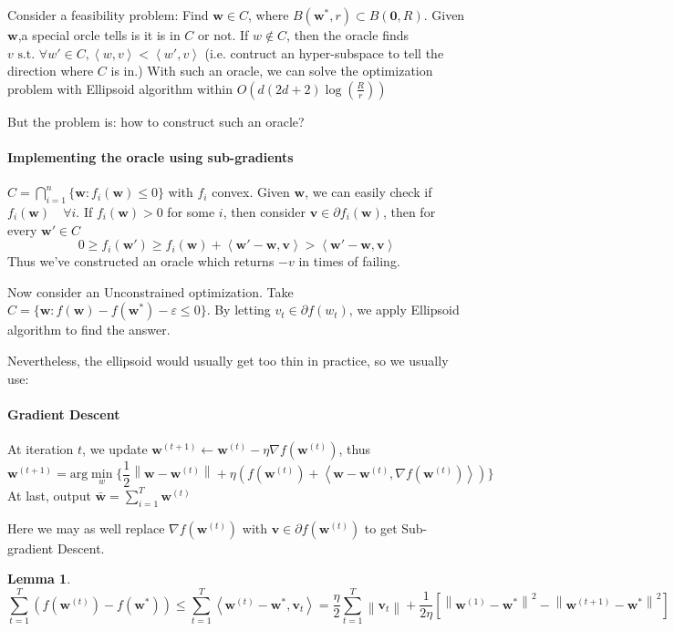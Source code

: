 \documentclass{book}
\newcommand{\st}{\text{ s.t. }}
\newcommand{\nm}[1]{\left\|#1\right\|}
\newcommand{\dual}[1]{\left<#1\right>}
\newtheorem{Lemma}[Thm]{Lemma}
\begin{document}
Consider a feasibility problem: Find $\mathbf{w} \in C$, where $B(\bm{w^{*}},r)\subset B(\mathbf{0},R)$. Given $\mathbf{w}$,a special orcle tells is it is in $C$ or not.  If $w\not \in C$, then the oracle finds $v\st \forall w'\in C, \dual{w,v}<\dual{w',v}$ (i.e. contruct an hyper-subspace to tell the direction where $C$ is in.) With such an oracle, we can solve the optimization problem with Ellipsoid algorithm within $O(d(2d+2)\log(\frac{R}{r}))$

But the problem is: how to construct such an oracle?

\paragraph{Implementing the oracle using sub-gradients}
$C=\bigcap_{i=1}^{n}\{\mathbf{w}:f_{i}(\mathbf{w})\leq 0\}$ with $f_{i}$ convex. Given $\mathbf{w}$, we can easily check if $f_{i}(\mathbf{w})\quad\forall i$. If $f_{i}(\mathbf{w})>0$ for some $i$, then consider $\mathbf{v}\in\partial f_{i}(\mathbf{w})$, then for every $\mathbf{w}'\in C$
\[0\geq f_{i}(\mathbf{w}')\geq f_{i}(\mathbf{w})+\dual{\mathbf{w}'-\mathbf{w},\mathbf{v}}>\dual{\mathbf{w}'-\mathbf{w},\mathbf{v}}\]
Thus we've constructed an oracle which returns $-v$ in times of failing.

Now consider an Unconstrained optimization. Take $C=\{\mathbf{w}:f(\mathbf{w})-f(\mathbf{w}^{*})-\varepsilon\leq 0\}$. By letting $v_{t}\in \partial f(w_{t})$, we apply Ellipsoid algorithm to find the answer. 

Nevertheless, the ellipsoid would usually get too thin in practice, so we usually use:

\paragraph{Gradient Descent}
At iteration $t$, we update $\mathbf{w}^{(t+1)}\leftarrow \mathbf{w}^{(t)}-\eta\nabla f(\mathbf{w}^{(t)})$, thus
\[\mathbf{w}^{(t+1)}=\mathrm{arg}\min_{w}\{\frac{1}{2}\nm{\mathbf{w}-\mathbf{w}^{(t)}}+\eta(f(\mathbf{w}^{(t)})+\dual{\mathbf{w}-\mathbf{w}^{(t)},\nabla f(\mathbf{w}^{{(t)}})})\}\]
At last, output $\bar{\mathbf{w}}=\sum_{i=1}^{T}\mathbf{w}^{(t)}$

Here we may as well replace $\nabla f(\mathbf{w}^{(t)})$ with $\mathbf{v}\in\partial f(\mathbf{w}^{(t)})$ to get Sub-gradient Descent.

\begin{Lemma}
  \[\sum_{t=1}^{T}(f(\mathbf{w}^{(t)})-f(\mathbf{w}^{*}))\leq \sum_{t=1}^{T}\dual{\mathbf{w}^{(t)}-\mathbf{w}^{*},\mathbf{v}_{t}}=\frac{\eta}{2}\sum_{t=1}^{T}\nm{\mathbf{v}_{t}}+\frac{1}{2\eta}[\nm{\mathbf{w}^{(1)}-\mathbf{w}^{*}}^{2}-\nm{\mathbf{w}^{(t+1)}-\mathbf{w}^{*}}^{2}]\]
\end{Lemma}
\end{document}

